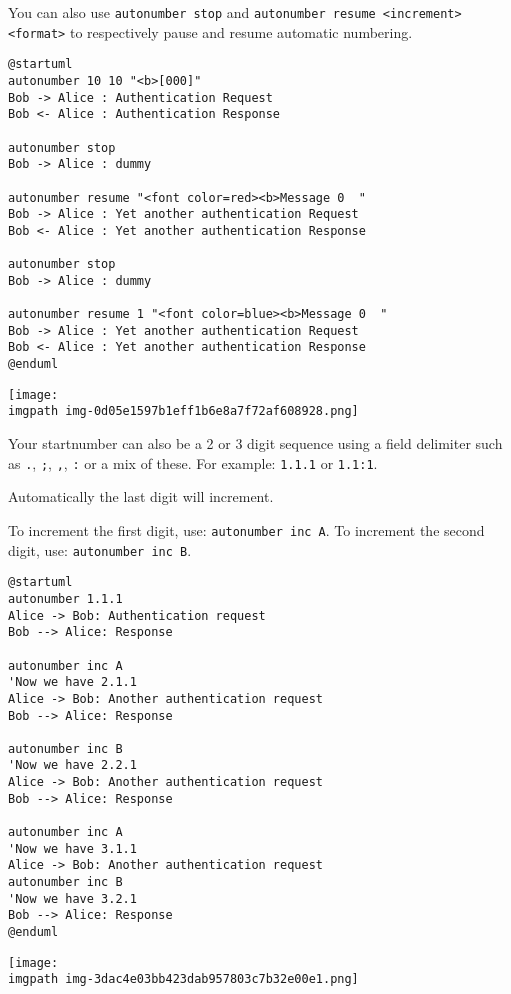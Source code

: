 You can also use \texttt{autonumber stop} and
\texttt{autonumber resume <increment> <format>} to respectively pause and resume
automatic numbering.


\begin{verbatim}
@startuml
autonumber 10 10 "<b>[000]"
Bob -> Alice : Authentication Request
Bob <- Alice : Authentication Response

autonumber stop
Bob -> Alice : dummy

autonumber resume "<font color=red><b>Message 0  "
Bob -> Alice : Yet another authentication Request
Bob <- Alice : Yet another authentication Response

autonumber stop
Bob -> Alice : dummy

autonumber resume 1 "<font color=blue><b>Message 0  "
Bob -> Alice : Yet another authentication Request
Bob <- Alice : Yet another authentication Response
@enduml
\end{verbatim}
\begin{center}
\texttt{[image: \\imgpath img-0d05e1597b1eff1b6e8a7f72af608928.png]}
\end{center}


Your startnumber can also be a 2 or 3 digit sequence using a field delimiter such as \texttt{.}, \texttt{;}, \texttt{,}, \texttt{:} or a mix of these. For example: \texttt{1.1.1} or \texttt{1.1:1}.


Automatically the last digit will increment.


To increment the first digit, use: \texttt{autonumber inc A}. To increment the second digit, use: \texttt{autonumber inc B}. 


\begin{verbatim}
@startuml
autonumber 1.1.1
Alice -> Bob: Authentication request
Bob --> Alice: Response

autonumber inc A
'Now we have 2.1.1
Alice -> Bob: Another authentication request
Bob --> Alice: Response

autonumber inc B
'Now we have 2.2.1
Alice -> Bob: Another authentication request
Bob --> Alice: Response

autonumber inc A
'Now we have 3.1.1
Alice -> Bob: Another authentication request
autonumber inc B
'Now we have 3.2.1
Bob --> Alice: Response
@enduml
\end{verbatim}
\begin{center}
\texttt{[image: \\imgpath img-3dac4e03bb423dab957803c7b32e00e1.png]}
\end{center}





